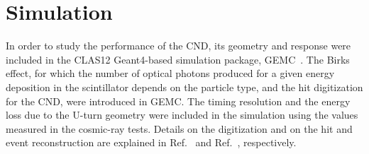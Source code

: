 \section{Simulation}

In order to study the performance of the CND, its geometry and response were included in the CLAS12 Geant4-based simulation package, GEMC~\cite{sim-nim}. The Birks effect, for which the number of optical photons produced for a given energy deposition in the scintillator depends on the particle type, and the hit digitization for the CND, were introduced in GEMC.
The timing resolution and the energy loss due to the U-turn geometry were included in the simulation using the values measured in the cosmic-ray tests.
Details on the digitization and on the hit and event reconstruction are explained in Ref.~\cite{sim-nim} and Ref.~\cite{recon-nim}, respectively.

